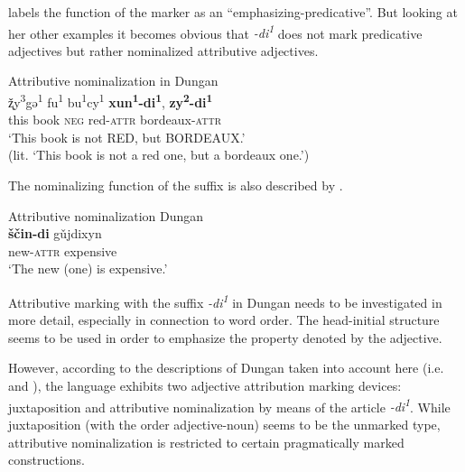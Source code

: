 \citet[82]{zevachina2001} labels the function of the marker as an “emphasizing-predicative”. But looking at her other examples it becomes obvious that \textit{-di\textsuperscript{1}} does not mark predicative adjectives but rather nominalized attributive adjectives.
\begin{exe}
\ex \rm{Attributive nominalization in Dungan \citep[82]{zevachina2001}}\\
\gll	ž̨y\textsuperscript{3}gə\textsuperscript{1} fu\textsuperscript{1} bu\textsuperscript{1}cy\textsuperscript{1} \textbf{xun\textsuperscript{1}-di\textsuperscript{1}}, \textbf{zy\textsuperscript{2}-di\textsuperscript{1}}\\
	this book \textsc{neg} red-\textsc{attr} bordeaux-\textsc{attr}\\
\glt	‘This book is not RED, but BORDEAUX.’\\
	(lit. ‘This book is not a red one, but a bordeaux one.’)
\end{exe}
The nominalizing function of the suffix is also described by \cite{kalimov1968}.
\begin{exe}
\ex \rm{Attributive nominalization Dungan \citep[484]{kalimov1968}}\\ \label{dungan nmlz}
\gll	\textbf{ščin-di} gǔjdixyn\\
	new-\textsc{attr} expensive\\
\glt	‘The new (one) is expensive.’
\end{exe}
Attributive marking with the suffix \textit{-di\textsuperscript{1}} in Dungan needs to be investigated in more detail, especially in connection to word order. The head-initial structure seems to be used in order to emphasize the property denoted by the adjective.

However, according to the descriptions of Dungan taken into account here (i.e.~\citealt{kalimov1968} and \citealt{zevachina2001}), the language exhibits two adjective attribution marking devices: juxtaposition and attributive nominalization by means of the article \textit{-di\textsuperscript{1}}. While juxtaposition (with the order adjective-noun) seems to be the unmarked type, attributive nominalization is restricted to certain pragmatically marked constructions.

